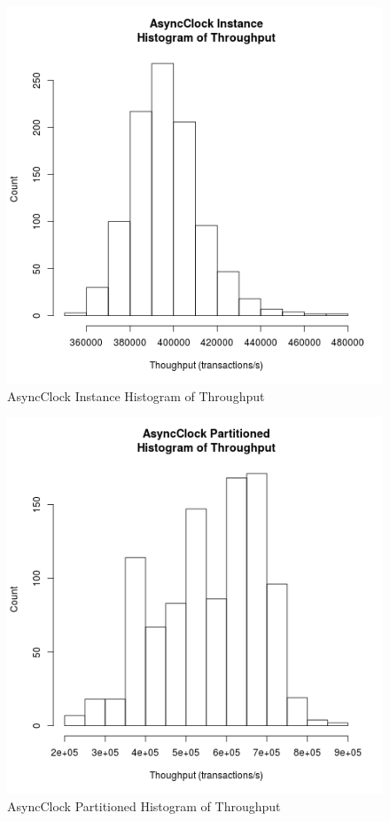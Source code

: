 \begin{figure}
\center
\includegraphics[height=.4\textheight]{async_instance_throughput_hist.png}
\caption{AsyncClock Instance Histogram of Throughput}
\label{async_instance_throughput}
\end{figure}

\begin{figure}
\center
\includegraphics[height=.4\textheight]{async_partitioned_throughput_hist.png}
\caption{AsyncClock Partitioned Histogram of Throughput\label{async_partitioned_throughput}}
\end{figure}


